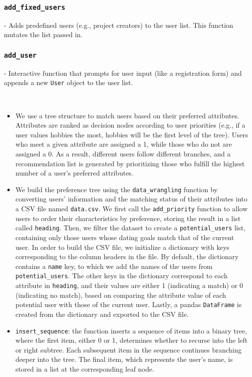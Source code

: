 \documentclass[fontsize=11pt]{article}
\begin{document}
\subsubsection*{\texttt{add\_fixed\_users}}
- Adds predefined users (e.g., project creators) to the user list. This function mutates the list passed in.

\subsubsection*{\texttt{add\_user}}
- Interactive function that prompts for user input (like a registration form) and appends a new \texttt{User} object to the user list.

\\


\begin{itemize}
\item We use a tree structure to match users based on their preferred attributes. Attributes are ranked as decision nodes according to user priorities (e.g., if a user values hobbies the most, hobbies will be the first level of the tree). Users who meet a given attribute are assigned a 1, while those who do not are assigned a 0. As a result, different users follow different branches, and a recommendation list is generated by prioritizing those who fulfill the highest number of a user's preferred attributes.
\\
\item We build the preference tree using the \texttt{data\_wrangling} function by converting users' information and the matching status of their attributes into a CSV file named \texttt{data.csv}. We first call the \texttt{add\_priority} function to allow users to order their characteristics by preference, storing the result in a list called \texttt{heading}. Then, we filter the dataset to create a \texttt{potential\_users} list, containing only those users whose dating goals match that of the current user. In order to build the CSV file, we initialize a dictionary with keys corresponding to the column headers in the file. By default, the dictionary contains a \texttt{name} key, to which we add the names of the users from \texttt{potential\_users}. The other keys in the dictionary correspond to each attribute in \texttt{heading}, and their values are either 1 (indicating a match) or 0 (indicating no match), based on comparing the attribute value of each potential user with those of the current user. Lastly, a pandas \texttt{DataFrame} is created from the dictionary and exported to the CSV file.
\\
\item \texttt{insert\_sequence}: the function inserts a sequence of items into a binary tree, where the first item, either 0 or 1, determines whether to recurse into the left or right subtree. Each subsequent item in the sequence continues branching deeper into the tree. The final item, which represents the user’s name, is stored in a list at the corresponding leaf node.



\end{itemize}
\end{document}
